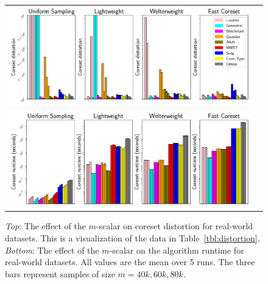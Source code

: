 \begin{figure}
\centering
\begin{tabular}{lc}
    \includegraphics[width=\linewidth]{images/distortion_real_data} \\
    \includegraphics[width=\linewidth]{images/runtime_real_data}
\end{tabular}

\caption{\emph{Top}: The effect of the $m$-scalar on coreset distortion for real-world datasets. This is a visualization of the data in
Table~\ref{tbl:distortion}.  \emph{Bottom}: The effect of the $m$-scalar on the algorithm runtime for real-world datasets. All values are the mean over 5 runs.
The three bars represent samples of size $m=40k, 60k, 80k$.}

\label{fig:coreset_size_on_quality}
\end{figure}
